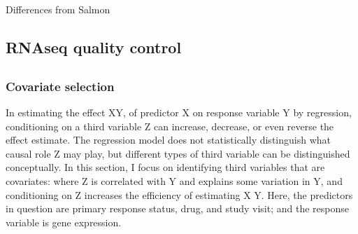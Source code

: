 \begin{outline}
%

Differences from Salmon

\subsection{RNAseq quality control}

\subsection{}

\subsubsection{Covariate selection}

In estimating the effect X\textrightarrow Y, of predictor X on response variable Y by regression, 
conditioning on a third variable Z can increase, decrease, or even reverse the effect estimate.
The regression model does not statistically distinguish what causal role Z may play,
but different types of third variable can be distinguished conceptually.
In this section, I focus on identifying third variables that are covariates:
where Z is correlated with Y and explains some variation in Y,
and conditioning on Z increases the efficiency of estimating X \textrightarrow Y.
Here, the predictors in question are primary response status, drug, and study visit; and the response variable is gene expression.


\end{outline}
